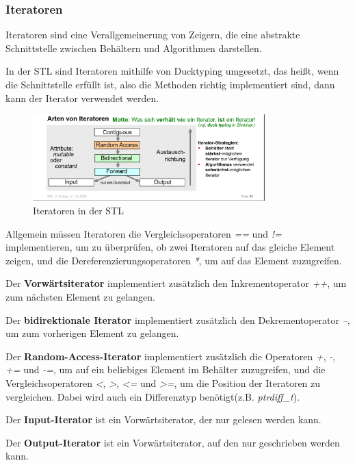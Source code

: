 \documentclass[12pt]{scrartcl}
\begin{document}
\subsubsection{Iteratoren}
Iteratoren sind eine Verallgemeinerung von Zeigern, die eine abstrakte Schnittstelle zwischen
Behältern und Algorithmen darstellen.

In der STL sind Iteratoren mithilfe von Ducktyping umgesetzt, das heißt, wenn die Schnittstelle erfüllt ist,
also die Methoden richtig implementiert sind, dann kann der Iterator verwendet werden.

\begin{figure}[H]
	\centering
	\includegraphics[width=0.8\textwidth]{images/stl_2.png}
	\caption{Iteratoren in der STL}
\end{figure}

Allgemein müssen Iteratoren die Vergleichsoperatoren \emph{==} und \emph{!=} implementieren, um zu überprüfen,
ob zwei Iteratoren auf das gleiche Element zeigen, und die Dereferenzierungsoperatoren \emph{*},
um auf das Element zuzugreifen.

Der \textbf{Vorwärtsiterator} implementiert zusätzlich den Inkrementoperator \emph{++}, um zum nächsten Element zu gelangen.

Der \textbf{bidirektionale Iterator} implementiert zusätzlich den Dekrementoperator \emph{--},
um zum vorherigen Element zu gelangen.

Der \textbf{Random-Access-Iterator} implementiert zusätzlich die Operatoren \emph{+}, \emph{-}, \emph{+=} und \emph{-=}, um auf ein
beliebiges Element im Behälter zuzugreifen, und die Vergleichsoperatoren \emph{<}, \emph{>}, \emph{<=} und \emph{>=},
um die Position der Iteratoren zu vergleichen. Dabei wird auch ein Differenztyp benötigt(z.B. \emph{ptrdiff\_t}).

Der \textbf{Input-Iterator} ist ein Vorwärtsiterator, der nur gelesen werden kann.

Der \textbf{Output-Iterator} ist ein Vorwärtsiterator, auf den nur geschrieben werden kann.
\linebreak
\end{document}

